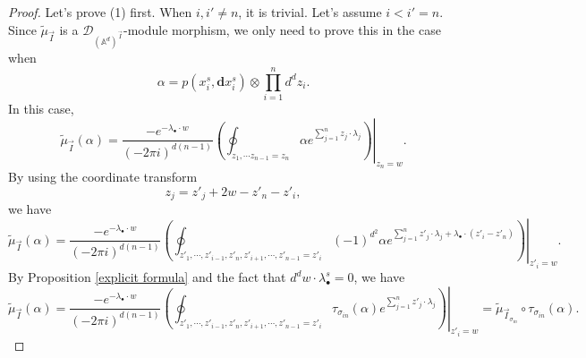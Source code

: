 \documentclass[11pt]{amsart}
\theoremstyle{definition}
\theoremstyle{remark}
\numberwithin{equation}{section}
\begin{document}
\begin{proof}
    Let's prove (1) first. When $i,i'\neq n$, it is trivial. Let's assume $i<i'=n$. Since $\tilde{\mu}_{\vec{I}}$ is a $\mathcal{D}_{(\mathbb{A}^{d})^{\vec{I}}}$-module morphism, we only need to prove this in the case when 
    $$
    \alpha=p(x_{i}^{s},\mathbf{d}x_{i}^{s})\otimes\prod_{i=1}^{n}d^{d}z_{i}.
    $$
    In this case,
    $$
    \tilde{\mu}_{\vec{I}}(\alpha)=\frac{-e^{-\lambda_{\bullet}\cdot w}}{(-2\pi i)^{d(n-1)}}\left.\left(\oint_{z_{1},\cdots z_{n-1}=z_{n}}\alpha e^{\sum_{j=1}^{n}z_{j}\cdot \lambda_{j}}\right)\right|_{z_{n}=w}.
    $$
    By using the coordinate transform
    $$
    z_{j}=z'_{j}+2w-z'_{n}-z'_{i},
    $$
    we have 
    $$
    \tilde{\mu}_{\vec{I}}(\alpha)=\frac{-e^{-\lambda_{\bullet}\cdot w}}{(-2\pi i)^{d(n-1)}}\left.\left(\oint_{z'_{1},\cdots, z'_{i-1},z'_{n}, z'_{i+1},\cdots, z'_{n-1}=z'_{i}}(-1)^{d^2}\alpha e^{\sum_{j=1}^{n}z'_{j}\cdot \lambda_{j}+\lambda_{\bullet}\cdot(z'_i-z'_n)}\right)\right|_{z'_{i}=w}.
    $$
    By Proposition \ref{explicit formula} and the fact that $d^{d}w\cdot\lambda_{\bullet}^{s}=0$, we have
    $$
    \tilde{\mu}_{\vec{I}}(\alpha)=\frac{-e^{-\lambda_{\bullet}\cdot w}}{(-2\pi i)^{d(n-1)}}\left.\left(\oint_{z'_{1},\cdots, z'_{i-1},z'_{n}, z'_{i+1},\cdots, z'_{n-1}=z'_{i}}\tau_{\sigma_{in}}(\alpha) e^{\sum_{j=1}^{n}z'_{j}\cdot \lambda_{j}}\right)\right|_{z'_{i}=w}=\tilde{\mu}_{\vec{I}_{\sigma_{in}}}\circ\tau_{\sigma_{in}}(\alpha).
    $$


\end{proof}
\end{document}
